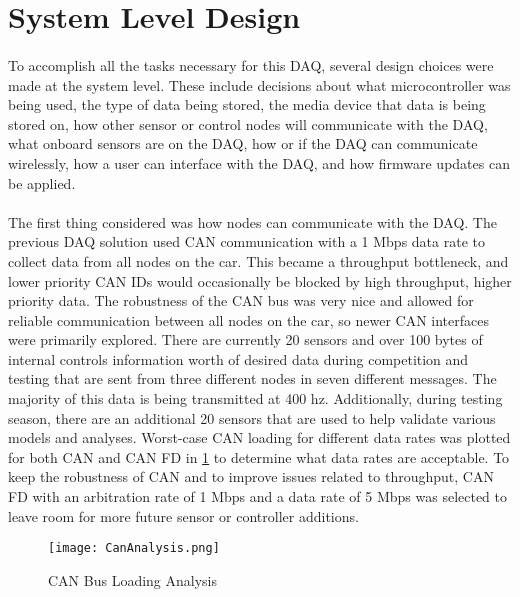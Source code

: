 \section{System Level Design}

\paragraph{}
To accomplish all the tasks necessary for this DAQ, several design choices were made at the system level.
These include decisions about what microcontroller was being used, the type of data being stored, the media device that data is being stored on, how other sensor or control nodes will communicate with the DAQ, what onboard sensors are on the DAQ, how or if the DAQ can communicate wirelessly, how a user can interface with the DAQ, and how firmware updates can be applied.

\paragraph{}
The first thing considered was how nodes can communicate with the DAQ.
The previous DAQ solution used CAN communication with a 1 Mbps data rate to collect data from all nodes on the car.
This became a throughput bottleneck, and lower priority CAN IDs would occasionally be blocked by high throughput, higher priority data.
The robustness of the CAN bus was very nice and allowed for reliable communication between all nodes on the car, so newer CAN interfaces were primarily explored.
There are currently 20 sensors and over 100 bytes of internal controls information worth of desired data during competition and testing that are sent from three different nodes in seven different messages.
The majority of this data is being transmitted at 400 hz.
Additionally, during testing season, there are an additional 20 sensors that are used to help validate various models and analyses.
Worst-case CAN loading for different data rates was plotted for both CAN and CAN FD in \cref{fig:CANAnalysis} to determine what data rates are acceptable.
To keep the robustness of CAN and to improve issues related to throughput, CAN FD with an arbitration rate of 1 Mbps and a data rate of 5 Mbps was selected to leave room for more future sensor or controller additions.

\begin{figure}[H]
	\centering
	\texttt{[image: CanAnalysis.png]}
	\caption{CAN Bus Loading Analysis}
	\label{fig:CANAnalysis}
\end{figure}

